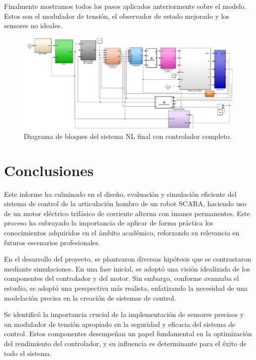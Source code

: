 \documentclass{article}
\begin{document}
Finalmente mostramos todos los pasos aplicados anteriormente sobre el modelo. Estos son el modulador de tensión,
el observador de estado mejorado y los sensores no ideales.

\begin{figure}[H]
    \centering
    \includegraphics[width=1\textwidth]{5.2.6.png}
    \caption{Diagrama de bloques del sistema NL final con controlador completo.}
\end{figure}

\newpage

\part*{Conclusiones}

Este informe ha culminado en el diseño, evaluación y simulación eficiente del sistema de control de la 
articulación hombro de un robot SCARA, haciendo uso de un motor eléctrico trifásico de corriente alterna 
con imanes permanentes. Este proceso ha subrayado la importancia de aplicar de forma práctica los 
conocimientos adquiridos en el ámbito académico, reforzando su relevancia en futuros escenarios 
profesionales.

En el desarrollo del proyecto, se plantearon diversas hipótesis que se contrastaron mediante 
simulaciones. En una fase inicial, se adoptó una visión idealizada de los componentes del controlador 
y del motor. Sin embargo, conforme avanzaba el estudio, se adoptó una perspectiva más realista, 
enfatizando la necesidad de una modelación precisa en la creación de sistemas de control.

Se identificó la importancia crucial de la implementación de sensores precisos y un modulador de tensión 
apropiado en la seguridad y eficacia del sistema de control. Estos componentes desempeñan un papel 
fundamental en la optimización del rendimiento del controlador, y su influencia es determinante para 
el éxito de todo el sistema.
\end{document}
